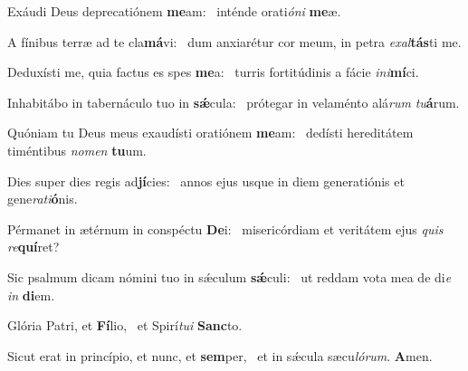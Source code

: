 \item Exáudi Deus deprecatiónem \textbf{me}am:~\psstar{} inténde orati\textit{óni} \textbf{me}æ.
\item A fínibus terræ ad te cla\textbf{má}vi:~\psstar{} dum anxiarétur cor meum, in petra \textit{exal}\textbf{tás}ti me.
\item Deduxísti me, quia factus es spes \textbf{me}a:~\psstar{} turris fortitúdinis a fácie \textit{ini}\textbf{mí}ci.
\item Inhabitábo in tabernáculo tuo in \textbf{sǽ}cula:~\psstar{} prótegar in velaménto alá\textit{rum} \textit{tu}\textbf{á}rum.
\item Quóniam tu Deus meus exaudísti oratiónem \textbf{me}am:~\psstar{} dedísti hereditátem timéntibus \textit{nomen} \textbf{tu}um.
\item Dies super dies regis ad\textbf{jí}cies:~\psstar{} annos ejus usque in diem generatiónis et gene\textit{rati}\textbf{ó}nis.
\item Pérmanet in ætérnum in conspéctu \textbf{De}i:~\psstar{} misericórdiam et veritátem ejus \textit{quis} \textit{re}\textbf{quí}ret?
\item Sic psalmum dicam nómini tuo in sǽculum \textbf{sǽ}culi:~\psstar{} ut reddam vota mea de di\textit{e} \textit{in} \textbf{di}em.
\item Glória Patri, et \textbf{Fí}lio,~\psstar{} et Spirí\textit{tui} \textbf{Sanc}to.
\item Sicut erat in princípio, et nunc, et \textbf{sem}per,~\psstar{} et in sǽcula sæcu\textit{lórum}. \textbf{A}men.
